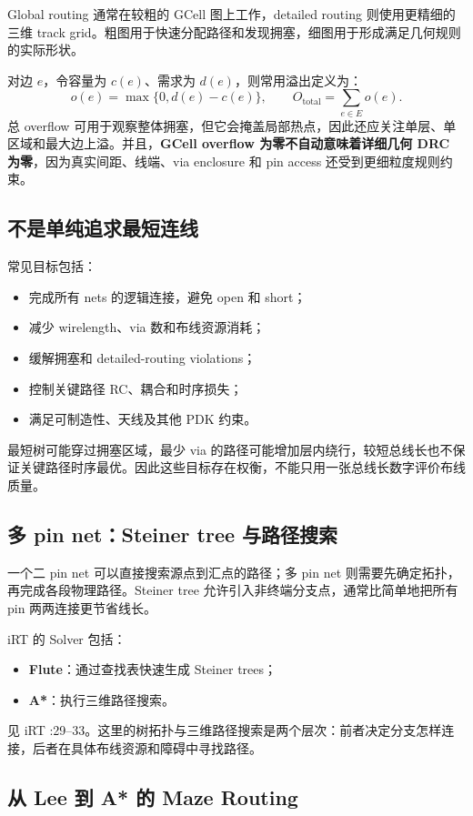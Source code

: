\documentclass[UTF8,a4paper,11pt,fontset=fandol]{ctexart}
\begin{document}
Global routing 通常在较粗的 GCell 图上工作，detailed routing 则使用更精细的三维 track grid。粗图用于快速分配路径和发现拥塞，细图用于形成满足几何规则的实际形状。

对边 $e$，令容量为 $c(e)$、需求为 $d(e)$，则常用溢出定义为：
\[
  o(e)=\max\{0,d(e)-c(e)\},\qquad
  O_{\mathrm{total}}=\sum_{e\in E}o(e).
\]
总 overflow 可用于观察整体拥塞，但它会掩盖局部热点，因此还应关注单层、单区域和最大边上溢。并且，\textbf{GCell overflow 为零不自动意味着详细几何 DRC 为零}，因为真实间距、线端、via enclosure 和 pin access 还受到更细粒度规则约束。

\subsection{不是单纯追求最短连线}

常见目标包括：
\begin{itemize}
  \item 完成所有 nets 的逻辑连接，避免 open 和 short；
  \item 减少 wirelength、via 数和布线资源消耗；
  \item 缓解拥塞和 detailed-routing violations；
  \item 控制关键路径 RC、耦合和时序损失；
  \item 满足可制造性、天线及其他 PDK 约束。
\end{itemize}

最短树可能穿过拥塞区域，最少 via 的路径可能增加层内绕行，较短总线长也不保证关键路径时序最优。因此这些目标存在权衡，不能只用一张总线长数字评价布线质量。

\subsection{多 pin net：Steiner tree 与路径搜索}

一个二 pin net 可以直接搜索源点到汇点的路径；多 pin net 则需要先确定拓扑，再完成各段物理路径。Steiner tree 允许引入非终端分支点，通常比简单地把所有 pin 两两连接更节省线长。

iRT 的 Solver 包括：
\begin{itemize}
  \item \textbf{Flute}：通过查找表快速生成 Steiner trees；
  \item \textbf{A*}：执行三维路径搜索。
\end{itemize}
见 iRT :29--33。这里的树拓扑与三维路径搜索是两个层次：前者决定分支怎样连接，后者在具体布线资源和障碍中寻找路径。

\subsection{从 Lee 到 A* 的 Maze Routing}
\end{document}
